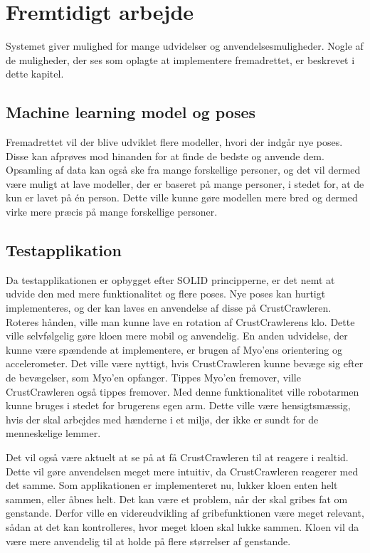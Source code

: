 \thispagestyle{fancy}
\chapter{Fremtidigt arbejde}
\label{chp:fremtidigtarbejde}
Systemet giver mulighed for mange udvidelser og anvendelsesmuligheder. Nogle af de muligheder, der ses som oplagte at implementere fremadrettet, er beskrevet i dette kapitel.

\section{Machine learning model og poses}
Fremadrettet vil der blive udviklet flere modeller, hvori der indgår nye poses. Disse kan afprøves mod hinanden for at finde de bedste og anvende dem. Opsamling af data kan også ske fra mange forskellige personer, og det vil dermed være muligt at lave modeller, der er baseret på mange personer, i stedet for, at de kun er lavet på én person. Dette ville kunne gøre modellen mere bred og dermed virke mere præcis på mange forskellige personer.

\section{Testapplikation}
Da testapplikationen er opbygget efter SOLID principperne\citep{RefWorks:10}, er det nemt at udvide den med mere funktionalitet og flere poses. Nye poses kan hurtigt implementeres, og der kan laves en anvendelse af disse på CrustCrawleren. Roteres hånden, ville man kunne lave en rotation af CrustCrawlerens klo. Dette ville selvfølgelig gøre kloen mere mobil og anvendelig. En anden udvidelse, der kunne være spændende at implementere, er brugen af Myo'ens orientering og accelerometer. Det ville være nyttigt, hvis CrustCrawleren kunne bevæge sig efter de bevægelser, som Myo'en opfanger. Tippes Myo'en fremover, ville CrustCrawleren også tippes fremover. Med denne funktionalitet ville robotarmen kunne bruges i stedet for brugerens egen arm. Dette ville være hensigtsmæssig, hvis der skal arbejdes med hænderne i et miljø, der ikke er sundt for de menneskelige lemmer.

Det vil også være aktuelt at se på at få CrustCrawleren til at reagere i realtid. Dette vil gøre anvendelsen meget mere intuitiv, da CrustCrawleren reagerer med det samme. Som applikationen er implementeret nu, lukker kloen enten helt sammen, eller åbnes helt. Det kan være et problem, når der skal gribes fat om genstande. Derfor ville en videreudvikling af gribefunktionen være meget relevant, sådan at det kan kontrolleres, hvor meget kloen skal lukke sammen. Kloen vil da være mere anvendelig til at holde på flere størrelser af genstande.